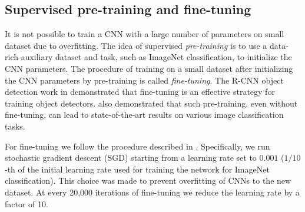 \subsection{Supervised pre-training and fine-tuning}
\label{sub:fine-train}
It is not possible to train a CNN with a large number of parameters on small dataset due to overfitting. 
The idea of supervised \emph{pre-training} is to use a data-rich auxiliary dataset and task, such as ImageNet classification, to initialize the CNN parameters. The procedure of training on a small dataset after initializing the CNN parameters by pre-training is called \emph{fine-tuning}.
The R-CNN object detection work in \cite{Rcnn} demonstrated that fine-tuning is an effective strategy for training object detectors.
\cite{Decaf} also demonstrated that such pre-training, even without fine-tuning, can lead to state-of-the-art results on various image classification tasks. 


For fine-tuning we follow the procedure described in \cite{Rcnn}.
Specifically, we run stochastic gradient descent (SGD) starting from a learning rate set to $0.001$ ($1/10$-th of the initial learning rate used for training the network for ImageNet classification). 
This choice was made to prevent overfitting of CNNs to the new dataset.
At every 20,000 iterations of fine-tuning we reduce the learning rate by a factor of 10.


